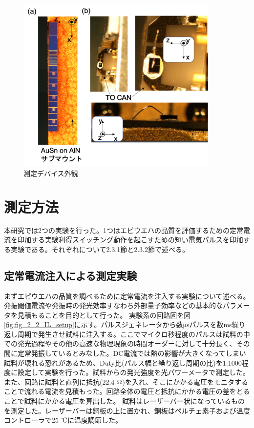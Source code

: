 \begin{figure}[h]%
	\centering
	\includegraphics[width=10cm]{figure/fig_2_1_mount.png}
	\caption{測定デバイス外観}
	\label{fig:fig_2_1_mount}
\end{figure}

\clearpage
\section{測定方法}%
本研究では2つの実験を行った。1つはエピウエハの品質を評価するための定常電流を印加する実験利得スイッチング動作を起こすための短い電気パルスを印加する実験である。それぞれについて2.3.1節と2.3.2節で述べる。
\subsection{定常電流注入による測定実験}%
まずエピウエハの品質を調べるために定常電流を注入する実験について述べる。発振閾値電流や発振時の発光効率すなわち外部量子効率などの基本的なパラメータを見積もることを目的として行った。
実験系の回路図を図\ref{fig:fig_2_2_IL_setup}に示す。パルスジェネレータから数\si{\micro s}パルスを数ms繰り返し周期で発生させ試料に注入する。ここでマイクロ秒程度のパルスは試料の中での発光過程やその他の高速な物理現象の時間オーダーに対して十分長く、その間に定常発振しているとみなした。DC電流では熱の影響が大きくなってしまい試料が壊れる恐れがあるため、Duty比(パルス幅と繰り返し周期の比)を1:1000程度に設定して実験を行った。試料からの発光強度を光パワーメータで測定した。また、回路に試料と直列に抵抗(22.4 $\rm{\Omega}$)を入れ、そこにかかる電圧をモニタすることで流れる電流を見積もった。回路全体の電圧と抵抗にかかる電圧の差をとることで試料にかかる電圧を算出した。
試料はレーザーバー状になっているものを測定した。レーザーバーは銅板の上に置かれ、銅板はペルチェ素子および温度コントローラで25 ℃に温度調節した。

